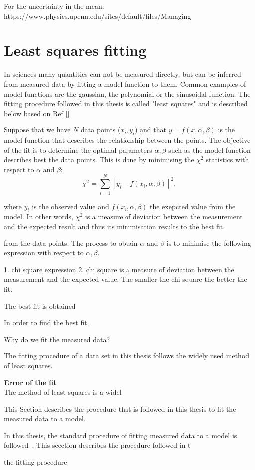 For the uncertainty in the mean:
https://www.physics.upenn.edu/sites/default/files/Managing%


\section{Least squares fitting}\label{app:non_linear_fitting}
In sciences many quantities can not be measured directly, but can be inferred from measured data by fitting a model function to them. Common examples of model functions are the gaussian, the polynomial or the sinusoidal function. The fitting procedure followed in this thesis is called "least squares" and is described below based on Ref []

Suppose that we have $N$ data points ($x_{i}, y_{i}$) and that $y=f(x,\alpha, \beta)$ is the model function that describes the relationship between the points. The objective of the fit is to determine the optimal parameters $\alpha, \beta$ such as the model function describes best the data points. This is done by minimising the $\chi^2$ statistics with respect to $\alpha$ and $\beta$:
\begin{equation}\label{eq:chi_square}
    \chi^2 = \sum_{i=1}^{N}[y_{i}-f(x_{i},\alpha, \beta)]^2,
\end{equation}

where $y_{i}$ is the observed value and $f(x_{i},\alpha, \beta)$ the exepcted value from the model. In other words, $\chi^2$ is a measure of deviation between the measurement and the expected result and thus its minimisation results to the best fit.



from the data points. The process to obtain $\alpha$ and $\beta$ is to minimise the following expression with respect to $\alpha, \beta$.


1. chi square expression
2. chi square is a measure of deviation between the measurement and the expected value. The smaller the chi square the better the fit.



The best fit is obtained

In order to find the best fit, 


Why do we fit the measured data?

The fitting procedure of a data set in this thesis follows the widely used method of least squares. 



\normalsize{\textbf{Error of the fit}}\\
The method of least squares is a widel

This Section describes the procedure that is followed in this thesis to fit the measured data to a model. 



In this thesis, the standard procedure of fitting measured data to a model is followed~\cite{gaus_fit_least_squares}. 
This scection describes the procedure followed in t


the fitting procedure